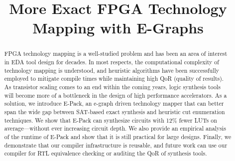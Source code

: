 \documentclass[10pt,conference]{IEEEtran}
\newcommand{\fullname}{More Exact FPGA Technology Mapping with E-Graphs}
\newcommand{\metric}{12\% fewer LUTs}
\begin{document}
\title{\fullname}
\author{}
\maketitle

\begin{abstract}
    FPGA technology mapping is a well-studied problem and has been an area of
    interest in EDA tool design for decades. In most respects, the computational
    complexity of technology mapping is understood, and heuristic algorithms have
    been successfully employed to mitigate compile times while maintaining high QoR
    (quality of results). As transistor scaling comes to an end within the coming
    years, logic synthesis tools will become more of a bottleneck in the design of
    high performance accelerators. As a solution, we introduce E-Pack, an e-graph
    driven technology mapper that can better span the wide gap between SAT-based
    exact synthesis and heuristic cut enumeration techniques. We show that E-Pack
    can synthesize circuits with \metric{} on average---without ever
    increasing circuit depth. We also provide an empirical analysis of the runtime
    of E-Pack and show that it is still practical for large designs. Finally, we
    demonstrate that our compiler infrastructure is reusable, and future work can
    use our compiler for RTL equivalence checking or auditing the QoR of synthesis
    tools.
\end{abstract}















\end{document}
